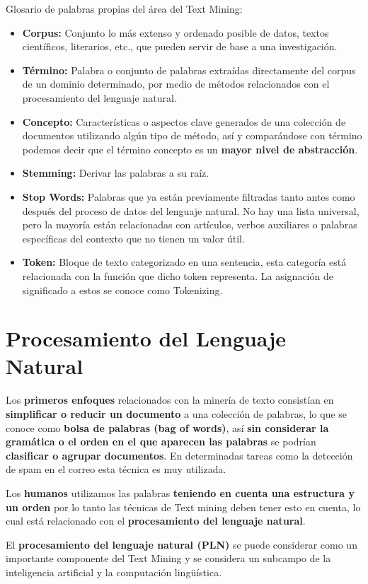 \documentclass[12pt, twoside, openright]{report} %
\begin{document}
Glosario de palabras propias del área del Text Mining:
\begin{itemize}
	\item \textbf{Corpus:} Conjunto lo más extenso y ordenado posible de datos, textos científicos, literarios, etc., que pueden servir de base a una investigación.
	\item \textbf{Término:} Palabra o conjunto de palabras extraídas directamente del corpus de un dominio determinado, por medio de métodos relacionados con el procesamiento del lenguaje natural.
	\item \textbf{Concepto:} Características o aspectos clave generados de una colección de documentos utilizando algún tipo de método, así y comparándose con término podemos decir que el término concepto es un \textbf{mayor nivel de abstracción}.
	\item \textbf{Stemming:} Derivar las palabras a su raíz.
	\item \textbf{Stop Words:} Palabras que ya están previamente filtradas tanto antes como después del proceso de datos del lenguaje natural. No hay una lista universal, pero la mayoría están relacionadas con artículos, verbos auxiliares o palabras específicas del contexto que no tienen un valor útil.
	\item \textbf{Token:} Bloque de texto categorizado en una sentencia, esta categoría está relacionada con la función que dicho token representa. La asignación de significado a estos se conoce como Tokenizing.
\end{itemize}

\section{Procesamiento del Lenguaje Natural}
Los \textbf{primeros enfoques} relacionados con la minería de texto consistían en \textbf{simplificar o reducir un documento} a una colección de palabras, lo que se conoce como \textbf{bolsa de palabras (bag of words)}, así \textbf{sin considerar la gramática o el orden en el que aparecen las palabras} se podrían \textbf{clasificar o agrupar documentos}. En determinadas tareas como la detección de spam en el correo esta técnica es muy utilizada. 

Los \textbf{humanos} utilizamos las palabras \textbf{teniendo en cuenta una estructura y un orden} por lo tanto las técnicas de Text mining deben tener esto en cuenta, lo cual está relacionado con el \textbf{procesamiento del lenguaje natural}. 

El \textbf{procesamiento del lenguaje natural (PLN)} se puede considerar como un importante componente del Text Mining y se considera un subcampo de la inteligencia artificial y la computación lingüística.
\end{document}
